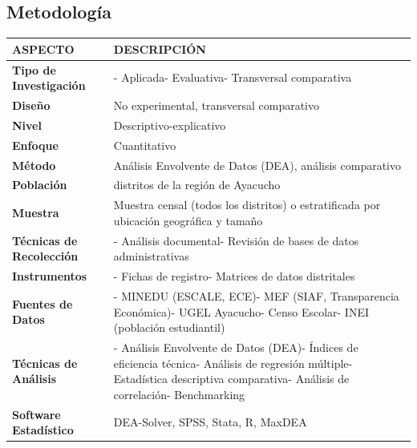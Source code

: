 \documentclass[
  man,
  floatsintext,
  longtable,
  a4paper,
  nolmodern,
  notxfonts,
  notimes,
  12pt,
  colorlinks=true,linkcolor=blue,citecolor=blue,urlcolor=blue]{apa7}
\newcounter{none} %
\begin{document}
\subsection{Metodología}\label{metodologuxeda-2}

{\def\LTcaptype{none} %
\begin{longtable}[]{@{}
  >{\raggedright\arraybackslash}p{}
  >{\raggedright\arraybackslash}p{}@{}}
\toprule\noalign{}
\begin{minipage}[b]{\linewidth}\raggedright
ASPECTO
\end{minipage} & \begin{minipage}[b]{\linewidth}\raggedright
DESCRIPCIÓN
\end{minipage} \\
\midrule\noalign{}
\endhead
\bottomrule\noalign{}
\endlastfoot
\textbf{Tipo de Investigación} & - Aplicada- Evaluativa- Transversal
comparativa \\
\textbf{Diseño} & No experimental, transversal comparativo \\
\textbf{Nivel} & Descriptivo-explicativo \\
\textbf{Enfoque} & Cuantitativo \\
\textbf{Método} & Análisis Envolvente de Datos (DEA), análisis
comparativo \\
\textbf{Población} & 119 distritos de la región de Ayacucho \\
\textbf{Muestra} & Muestra censal (todos los distritos) o estratificada
por ubicación geográfica y tamaño \\
\textbf{Técnicas de Recolección} & - Análisis documental- Revisión de
bases de datos administrativas \\
\textbf{Instrumentos} & - Fichas de registro- Matrices de datos
distritales \\
\textbf{Fuentes de Datos} & - MINEDU (ESCALE, ECE)- MEF (SIAF,
Transparencia Económica)- UGEL Ayacucho- Censo Escolar- INEI (población
estudiantil) \\
\textbf{Técnicas de Análisis} & - Análisis Envolvente de Datos (DEA)-
Índices de eficiencia técnica- Análisis de regresión múltiple-
Estadística descriptiva comparativa- Análisis de correlación-
Benchmarking \\
\textbf{Software Estadístico} & DEA-Solver, SPSS, Stata, R, MaxDEA \\
\end{longtable}
}
\end{document}
